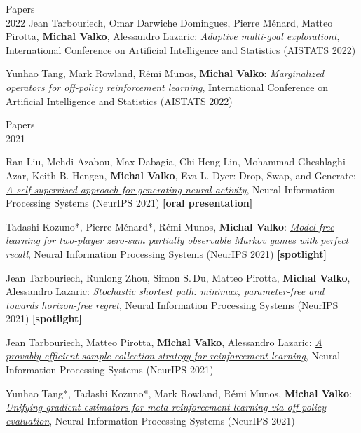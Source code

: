 \documentclass{resume}
\begin{document}
\begin{category}{Papers\\2022}
\citembullet
Jean Tarbouriech, Omar Darwiche Domingues, Pierre M\' enard, Matteo Pirotta, {\bf Michal Valko}, Alessandro Lazaric: 
\href{https://arxiv.org/abs/2111.12045.pdf}{\emph{Adaptive multi-goal explorationt}},
International Conference on Artificial Intelligence and Statistics
({\sf AISTATS 2022}) 

\citembullet
Yunhao Tang, Mark Rowland, R\' emi Munos,  {\bf Michal Valko}: 
\href{https://arxiv.org/pdf/2203.16177.pdf}{\emph{Marginalized operators for off-policy reinforcement learning}}, International Conference on Artificial Intelligence and Statistics
({\sf AISTATS 2022}) 
\end{category}


\begin{category}{Papers\\2021}





\citembullet
Ran Liu, Mehdi Azabou, Max Dabagia, Chi-Heng Lin, Mohammad Gheshlaghi Azar, Keith B. Hengen, {\bf Michal Valko}, Eva L. Dyer: Drop, Swap, and Generate:
\href{https://arxiv.org/pdf/2111.02338.pdf}{\emph{A self-supervised approach for generating neural activity}},
Neural Information Processing Systems
({\sf NeurIPS 2021}) {\bf [oral presentation]}

\citembullet
Tadashi Kozuno*, Pierre M\' enard*, R\' emi Munos, {\bf Michal Valko}: 
\href{https://arxiv.org/pdf/2106.06279.pdf}{\emph{Model-free learning for two-player zero-sum partially observable Markov games with perfect recall}},
Neural Information Processing Systems
({\sf NeurIPS 2021}) {\bf [spotlight]}


\citembullet
Jean Tarbouriech, Runlong Zhou, Simon S.\,Du, Matteo Pirotta, {\bf Michal Valko}, Alessandro Lazaric: 
\href{https://arxiv.org/pdf/2104.11186.pdf}{\emph{Stochastic shortest path: minimax, parameter-free and towards horizon-free regret}},
Neural Information Processing Systems
({\sf NeurIPS 2021})  {\bf [spotlight]}

\citembullet
Jean Tarbouriech, Matteo Pirotta, {\bf Michal Valko}, Alessandro Lazaric:
\href{http://arxiv.org/abs/2007.06437.pdf}
{\emph{A provably efficient sample collection strategy for reinforcement learning}},
Neural Information Processing Systems
({\sf NeurIPS 2021}) 



\citembullet
Yunhao Tang*, Tadashi Kozuno*, Mark Rowland, R\' emi Munos,  {\bf Michal Valko}: 
\href{https://arxiv.org/pdf/2106.13125.pdf}{\emph{Unifying gradient estimators for meta-reinforcement learning via off-policy evaluation}},
Neural Information Processing Systems
({\sf NeurIPS 2021}) 





\end{category}
\end{document}
